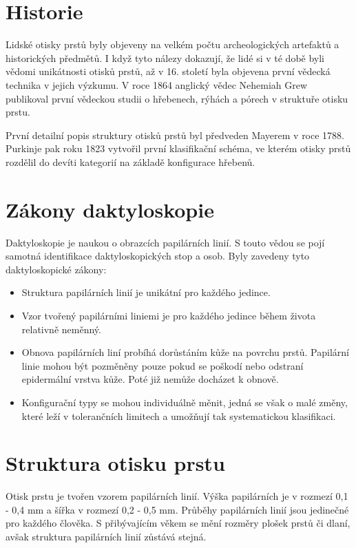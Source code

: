 \section{Historie}
Lidské otisky prstů byly objeveny na velkém počtu archeologických artefaktů a historických předmětů. I když tyto nálezy dokazují, že lidé si v té době byli vědomi unikátnosti otisků prstů, až v 16. století byla objevena první vědecká technika v jejich výzkumu. V roce 1864 anglický vědec Nehemiah Grew publikoval první vědeckou studii o hřebenech, rýhách a pórech v struktuře otisku prstu.

První detailní popis struktury otisků prstů byl předveden Mayerem v roce 1788. Purkinje pak roku 1823 vytvořil první klasifikační schéma, ve kterém otisky prstů rozdělil do devíti kategorií na základě konfigurace hřebenů.\cite{Maltoni2009}

\section{Zákony daktyloskopie}
Daktyloskopie je naukou o obrazcích papilárních linií. S touto vědou se pojí samotná identifikace daktyloskopických stop a osob.\cite{PolicieDaktyloskopie} Byly zavedeny tyto daktyloskopické zákony\cite{Drahansky}:
\begin{itemize}
    \item Struktura papilárních linií je unikátní pro každého jedince.
    \item Vzor tvořený papilárními liniemi je pro každého jedince během života relativně neměnný.
    \item Obnova papilárních liní probíhá dorůstáním kůže na povrchu prstů. Papilární linie mohou být pozměněny pouze pokud se poškodí nebo odstraní epidermální vrstva kůže. Poté již nemůže docházet k obnově.
    \item Konfigurační typy se mohou individuálně měnit, jedná se však o malé změny, které leží v tolerančních limitech a umožňují tak systematickou klasifikaci.
\end{itemize}

\section{Struktura otisku prstu}
Otisk prstu je tvořen vzorem papilárních linií. Výška papilárních je v rozmezí 0,1 - 0,4 mm a šířka v rozmezí 0,2 - 0,5 mm.\cite{Drahansky} Průběhy papilárních linií jsou jedinečné pro každého člověka. S přibývajícím věkem se mění rozměry plošek prstů či dlaní, avšak struktura papilárních linií zůstává stejná.


